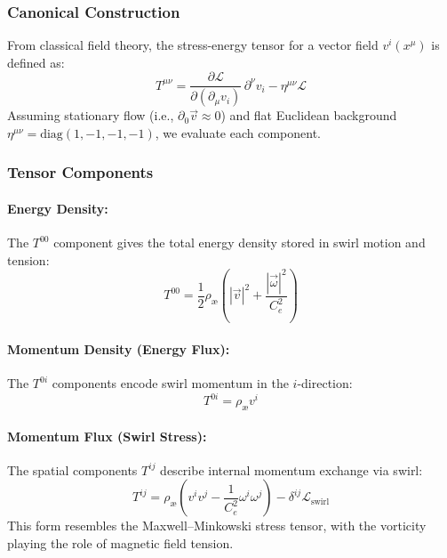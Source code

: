 \subsubsection*{Canonical Construction}

From classical field theory, the stress-energy tensor for a vector field \( v^i(x^\mu) \) is defined as:
\begin{equation}
    T^{\mu\nu} = \frac{\partial \mathcal{L}}{\partial(\partial_\mu v_i)} \, \partial^\nu v_i - \eta^{\mu\nu} \mathcal{L}
\end{equation}
Assuming stationary flow (i.e., \( \partial_0 \vec{v} \approx 0 \)) and flat Euclidean background \( \eta^{\mu\nu} = \text{diag}(1, -1, -1, -1) \), we evaluate each component.

\subsubsection*{Tensor Components}

\paragraph{Energy Density:} The \( T^{00} \) component gives the total energy density stored in swirl motion and tension:
\begin{equation}
    T^{00} = \frac{1}{2} \rho_\text{\ae} \left( |\vec{v}|^2 + \frac{|\vec{\omega}|^2}{C_e^2} \right)
\end{equation}

\paragraph{Momentum Density (Energy Flux):} The \( T^{0i} \) components encode swirl momentum in the \( i \)-direction:
\begin{equation}
    T^{0i} = \rho_\text{\ae} v^i
\end{equation}

\paragraph{Momentum Flux (Swirl Stress):} The spatial components \( T^{ij} \) describe internal momentum exchange via swirl:
\begin{equation}
    T^{ij} = \rho_\text{\ae} \left( v^i v^j - \frac{1}{C_e^2} \omega^i \omega^j \right) - \delta^{ij} \mathcal{L}_{\text{swirl}}
\end{equation}
This form resembles the Maxwell–Minkowski stress tensor, with the vorticity playing the role of magnetic field tension.


